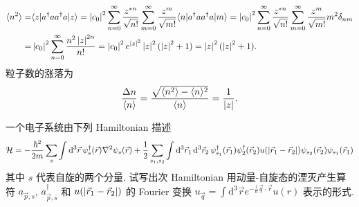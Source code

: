 \documentclass{assignment}
\begin{document}
\begin{pf}
\begin{itemize}
        \begin{align}
            \langle n^2\rangle=&\langle z\rvert a^{\dagger}aa^{\dagger}a\lvert z\rangle=\left\lvert c_0\right\rvert^2\sum_{n=0}^{\infty}\frac{z^{*n}}{\sqrt{n!}}\sum_{m=0}^{\infty}\frac{z^m}{\sqrt{m!}}\langle n\rvert a^{\dagger}aa^{\dagger}a\lvert m\rangle=\left\lvert c_0\right\rvert^2\sum_{n=0}^{\infty}\frac{z^{*n}}{\sqrt{n!}}\sum_{m=0}^{\infty}\frac{z^m}{\sqrt{m!}}m^2\delta_{nm}\\
            =&\left\lvert c_0\right\rvert^2\sum_{n=0}^{\infty}\frac{n^2\left\lvert z\right\rvert^{2n}}{n!}=\left\lvert c_0\right\rvert^2e^{\left\lvert z\right\rvert^2}\left\lvert z\right\rvert^2(\left\lvert z\right\rvert^2+1)=\left\lvert z\right\rvert^2(\left\lvert z\right\rvert^2+1).
        \end{align}
        粒子数的涨落为
        \begin{align}
            \frac{\Delta n}{\langle n\rangle}=\frac{\sqrt{\langle n^2\rangle-\langle n\rangle^2}}{\langle n\rangle}=\frac{1}{\left\lvert z\right\rvert}.
        \end{align}
    \end{itemize}
\end{pf}

\begin{prob}
    一个电子系统由下列 Hamiltonian 描述
    \begin{align}
        \mathcal{H}=-\frac{\hbar^2}{2m}\sum_s\int\mathrm{d}^3\vec{r}\,\psi_s^{\dagger}(\vec{r})\nabla^2\psi_s(\vec{r})+\frac{1}{2}\sum_{s_1,s_2}\int\mathrm{d}^3\vec{r}_1\,\mathrm{d}^3\vec{r}_2\,\psi_{s_1}^{\dagger}(\vec{r}_1)\psi_2^{\dagger}(\vec{r}_2)u(\left\lvert\vec{r}_1-\vec{r}_2\right\rvert)\psi_{s_2}(\vec{r}_2)\psi_{s_1}(\vec{r}_1)
    \end{align}
    其中 $s$ 代表自旋的两个分量. 试写出次 Hamiltonian 用动量-自旋态的湮灭产生算符 $a_{\vec{p},s}$, $a_{\vec{p},s}^{\dagger}$ 和 $u(\left\lvert\vec{r}_1-\vec{r}_2\right\rvert)$ 的 Fourier 变换 $u_{\vec{q}}=\int\mathrm{d}^3\vec{r}e^{-\frac{i}{\hbar}\vec{q}\cdot\vec{r}}u(r)$ 表示的形式.
\end{prob}
\begin{pf}

\end{pf}
\end{document}

